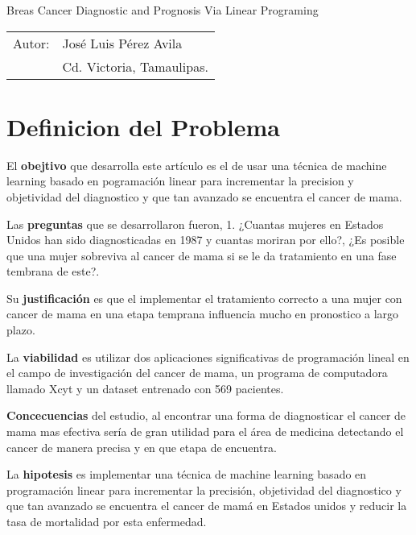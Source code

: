 \documentclass[11pt,letterpaper]{article}
\date{\specialdate\today}
\begin{document}
\newpage
\pagestyle{fancy}
\fancyhf{}
\vspace*{6cm}
\begin{center}
\Huge  {Breas Cancer Diagnostic and Prognosis Via Linear Programing}
\vspace{1cm}
\end{center}
\begin{center}
\begin{tabular}{ll}
Autor: & José Luis Pérez Avila\\
& Cd. Victoria, Tamaulipas.
\end{tabular}
\end{center}

\section{Definicion del Problema}
El \textbf{obejtivo} que desarrolla este artículo es el de usar una técnica de machine learning basado en pogramación linear para incrementar la precision y objetividad del diagnostico y que tan avanzado se encuentra el cancer de mama. 

Las \textbf{preguntas} que se desarrollaron fueron, 1. ¿Cuantas mujeres en Estados Unidos han sido diagnosticadas en 1987 y cuantas moriran por ello?, ¿Es posible que una mujer sobreviva al cancer de mama si se le da tratamiento en una fase tembrana de este?.

Su \textbf{justificación} es que el implementar el tratamiento correcto a una mujer con cancer de mama en una etapa temprana influencia mucho en pronostico a largo plazo.

La \textbf{viabilidad} es utilizar dos aplicaciones significativas de programación lineal en el campo de investigación del cancer de mama, un programa de computadora llamado Xcyt y un dataset entrenado con 569 pacientes.

\textbf{Concecuencias} del estudio, al encontrar una forma de diagnosticar el cancer de mama mas efectiva sería de gran utilidad para el área de medicina detectando el cancer de manera precisa y en que etapa de encuentra.

La \textbf{hipotesis} es implementar una técnica de machine learning basado en programación linear para incrementar la precisión, objetividad del diagnostico y que tan avanzado se encuentra el cancer de mamá en Estados unidos y reducir la tasa de mortalidad por esta enfermedad. 
\end{document}
